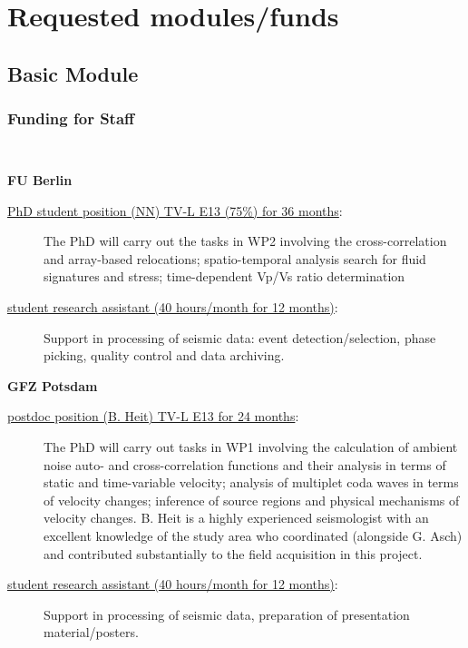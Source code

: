 \documentclass[11pt]{article}
\providecommand{\currfilename}{}
\newcommand{\showfile}{{\bf \tt \color{blue} \currfilename}}
\newcommand{\note}[1]{{\it \color{red} #1}}
\newcommand{\noteft}[1]{{\it \color{magenta} FT:#1}}
\newcommand{\note}[1]{}
\newcommand{\noteft}[1]{}
\newcommand{\showfile}{}
\begin{document}
\section{Requested modules/funds}
\subsection{Basic Module}

\subsubsection{Funding for Staff}
\showfile

\textbf{FU Berlin}
\begin{description}
\item[\underline{ PhD student position (NN) TV-L E13 (75\%) for 36 months}:] 
The PhD will carry out the tasks in WP2 involving the cross-correlation and array-based relocations;  spatio-temporal analysis search for fluid signatures and stress; time-dependent Vp/Vs ratio determination  
\item[\underline{ student research assistant (40 hours/month for 12 months)}:] Support in processing of seismic data: event detection/selection, phase picking, quality control and data archiving.
\end{description}
\textbf{GFZ Potsdam} %
\begin{description}\item[\underline{ postdoc position (B. Heit) TV-L E13 for 24 months}:] 
The PhD will carry out tasks in WP1 involving the calculation of ambient noise auto- and cross-correlation functions and their analysis in terms of static and time-variable velocity; analysis of multiplet coda waves in terms of velocity changes; inference of source regions and physical mechanisms of velocity changes. B. Heit is a highly experienced seismologist with an excellent knowledge of the study area who coordinated (alongside G. Asch) and contributed substantially to the field acquisition in this project.  
\item[\underline{ student research assistant (40 hours/month for 12 months)}:] Support in processing of seismic data, preparation of presentation material/posters.
\end{description}
%
\end{document}
